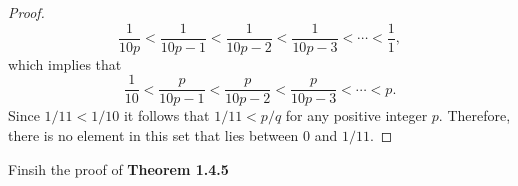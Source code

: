 \documentclass[12pt]{article}
\newenvironment{problem}[2][Problem]{\begin{trivlist}
		\item[\hskip \labelsep {\bfseries #1}\hskip \labelsep {\bfseries #2.}]}{\end{trivlist}}
\begin{document}
\begin{problem}{1.4.6}
\begin{enumerate}[label=(\alph*)]
\begin{proof}
				\begin{equation*}
					\frac{1}{10p} <  \frac{1}{10p-1} < \frac{1}{10p-2} < \frac{1}{10p-3} < \cdots < \frac{1}{1},
				\end{equation*}
				which implies that
				\begin{equation*}
					\frac{1}{10} < \frac{p}{10p-1} < \frac{p}{10p-2} < \frac{p}{10p-3} < \cdots < p.
				\end{equation*}
				Since $1/11 < 1/10$ it follows that $1/11 < p/q$ for any positive integer $p$. Therefore, there is no element in this set that lies between 0 and $1/11$.
			\end{proof}
		\end{enumerate}
	\end{problem}
	
	\begin{problem}{1.4.7}
		Finsih the proof of \textbf{Theorem 1.4.5} 
	\end{problem}
	
\end{document}
